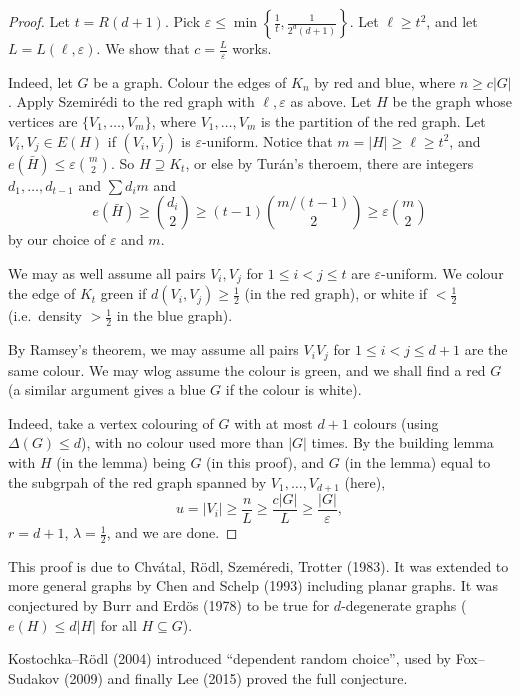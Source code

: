 \documentclass[a4paper]{article}
\begin{document}
\begin{proof}
  Let $t = R(d + 1)$. Pick $\varepsilon \leq \min \left\{\frac{1}{t}, \frac{1}{2^d (d + 1)}\right\}$. Let $\ell \geq t^2$, and let $L = L(\ell, \varepsilon)$. We show that $c = \frac{L}{\varepsilon}$ works.

  Indeed, let $G$ be a graph. Colour the edges of $K_n$ by red and blue, where $n \geq c |G|$. Apply Szemir\'edi to the red graph with $\ell, \varepsilon$ as above. Let $H$ be the graph whose vertices are $\{V_1, \ldots, V_m\}$, where $V_1, \ldots, V_m$ is the partition of the red graph. Let $V_i, V_j \in E(H)$ if $(V_i, V_j)$ is $\varepsilon$-uniform. Notice that $m = |H| \geq \ell \geq t^2$, and $e(\bar{H}) \leq \varepsilon \binom{m}{2}$. So $H \supseteq K_t$, or else by Tur\'an's theroem, there are integers $d_1, \ldots, d_{t - 1}$ and $\sum d_i m$ and
  \[
    e(\bar{H}) \geq \binom{d_i}{2}\geq (t - 1) \binom{m/(t - 1)}{2} \geq \varepsilon \binom{m}{2}
  \]
  by our choice of $\varepsilon$ and $m$.

  We may as well assume all pairs $V_i, V_j$ for $1 \leq i < j \leq t$ are $\varepsilon$-uniform. We colour the edge of $K_t$ green if $d(V_i, V_j) \geq \frac{1}{2}$ (in the red graph), or white if $< \frac{1}{2}$ (i.e.\ density $> \frac{1}{2}$ in the blue graph).

  By Ramsey's theorem, we may assume all pairs $V_i V_j$ for $1 \leq i < j \leq d + 1$ are the same colour. We may wlog assume the colour is green, and we shall find a red $G$ (a similar argument gives a blue $G$ if the colour is white).

  Indeed, take a vertex colouring of $G$ with at most $d + 1$ colours (using $\Delta(G) \leq d$), with no colour used more than $|G|$ times. By the building lemma with $H$ (in the lemma) being $G$ (in this proof), and $G$ (in the lemma) equal to the subgrpah of the red graph spanned by $V_1, \ldots, V_{d + 1}$ (here),
  \[
    u = |V_i| \geq \frac{n}{L} \geq \frac{c |G|}{L} \geq \frac{|G|}{\varepsilon},
  \]
  $r = d + 1$, $\lambda = \frac{1}{2}$, and we are done.
\end{proof}

This proof is due to Chv\'atal, R\"odl, Szem\'eredi, Trotter (1983). It was extended to more general graphs by Chen and Schelp (1993) including planar graphs. It was conjectured by Burr and Erd\"os (1978) to be true for $d$-degenerate graphs ($e(H) \leq d |H|$ for all $H \subseteq G$).

Kostochka--R\"odl (2004) introduced ``dependent random choice'', used by Fox--Sudakov (2009) and finally Lee (2015) proved the full conjecture.
\end{document}
